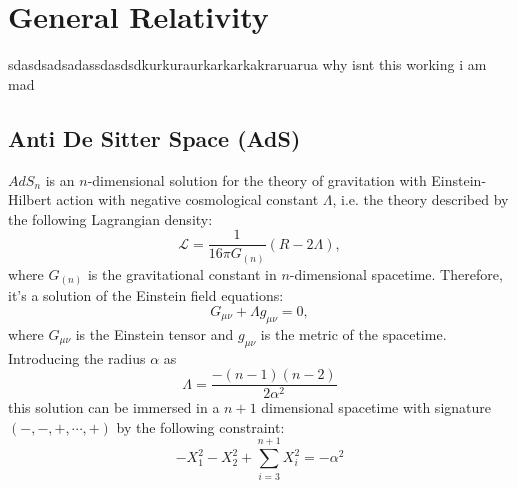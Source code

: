 \chapter{General Relativity}


sdasdsadsadassdasdsdkurkuraurkarkarkakraruarua
why isnt this working i am mad

\section{Anti De Sitter Space (AdS)}
$AdS_n$ is an $n$-dimensional solution for the theory of gravitation with Einstein-Hilbert action with negative cosmological constant $\Lambda$, i.e. the theory described by the following Lagrangian density:
\begin{equation}
\mathcal{L} = \frac{1}{16\pi G_{(n)}}(R-2\Lambda),
\end{equation}
where $G_{(n)}$ is the gravitational constant in $n$-dimensional spacetime. Therefore, it's a solution of the Einstein field equations:
\begin{equation}
G_{\mu\nu} + \Lambda g_{\mu\nu} = 0,
\end{equation}
where $G_{\mu\nu}$ is the Einstein tensor and $g_{\mu\nu}$ is the metric of the spacetime. Introducing the radius $\alpha$ as 
\begin{equation}
\Lambda = \frac{-(n-1)(n-2)}{2\alpha^2}
\end{equation}
this solution can be immersed in a $n+1$ dimensional spacetime with signature $(-,-,+,\cdots,+)$ by the following constraint:
\begin{equation}
-X^2_1 - X^2_2 + \sum_{i=3}^{n+1}X_i^2 = -\alpha^2
\end{equation}
